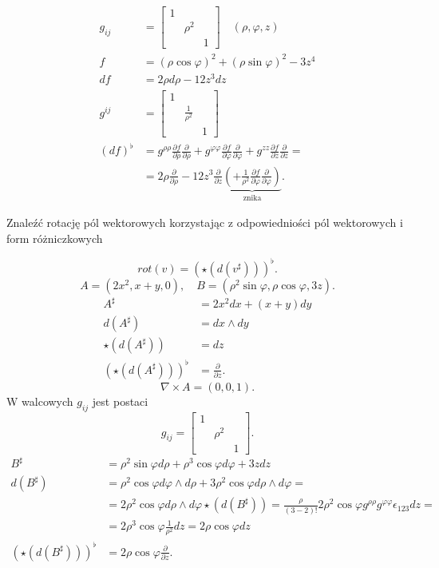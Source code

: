\documentclass[../main.tex]{subfiles}
\begin{document}
\begin{align*}
    g_{ij} &= \begin{bmatrix} 1&&\\&\rho^2&\\&&1 \end{bmatrix}\quad (\rho, \varphi, z)\\
        f &= (\rho \cos \varphi)^2 + (\rho \sin \varphi)^2 - 3z^4\\
        df &= 2\rho d\rho - 12z^3 dz\\
        g^{ij} &= \begin{bmatrix} 1&&\\&\frac{1}{\rho^2}&\\&&1 \end{bmatrix}\\
            \left( df \right)^\flat &= g^{\rho\rho} \frac{\partial f}{\partial \rho} \frac{\partial }{\partial \rho} + g^{\varphi\varphi} \frac{\partial f}{\partial \varphi} \frac{\partial }{\partial \varphi} + g^{zz} \frac{\partial f}{\partial z} \frac{\partial }{\partial z} =\\
            &= 2\rho \frac{\partial }{\partial \rho} - 12z^3 \frac{\partial }{\partial z} \underbrace{\left(+ \frac{1}{\rho^2} \frac{\partial f}{\partial \varphi} \frac{\partial }{\partial \varphi}\right)}_{\text{znika}}
.\end{align*}
\begin{cw}
    Znaleźć rotację pól wektorowych korzystając z odpowiedniości pól wektorowych i form różniczkowych
\end{cw}
\[
    rot(v) = \left( \star \left( d\left( v^\sharp \right)  \right) \right)^\flat
.\]
\[
    A = \left( 2x^2, x+y, 0 \right),\quad B = \left( \rho^2\sin\varphi, \rho\cos\varphi, 3z \right)
.\]
\begin{align*}
    A^\sharp &= 2x^2 dx + (x+y) dy\\
    d(A^\sharp) &= dx\land dy\\
    \star(d(A^\sharp)) &= dz\\
    \left( \star \left( d(A^\sharp) \right)  \right)^\flat &= \frac{\partial }{\partial z}
.\end{align*}
\[
    \nabla \times A = \left( 0,0,1 \right)
.\]
W walcowych $g_{ij}$ jest postaci
\[
    g_{ij} = \begin{bmatrix} 1&&\\&\rho^2&\\&&1 \end{bmatrix}
.\]
\begin{align*}
    B^\sharp &= \rho^2 \sin\varphi d\rho + \rho^3 \cos \varphi d\varphi + 3zdz\\
    d(B^\sharp) &= \rho^2\cos\varphi d\varphi \land d\rho + 3\rho^2\cos\varphi d\rho\land d\varphi =\\
    &= 2\rho^2\cos\varphi d\rho\land d\varphi
    \star\left(d(B^\sharp)\right) = \frac{\rho}{(3-2)!} 2 \rho^2 \cos\varphi g^{\rho\rho} g^{\varphi\varphi} \epsilon_{123} dz = \\
    &= 2\rho^3 \cos\varphi \frac{1}{\rho^2}dz = 2\rho\cos\varphi dz\\
    \left( \star \left( d(B^\sharp) \right) \right)^\flat &= 2\rho\cos\varphi \frac{\partial }{\partial z}
.\end{align*}
\end{document}
